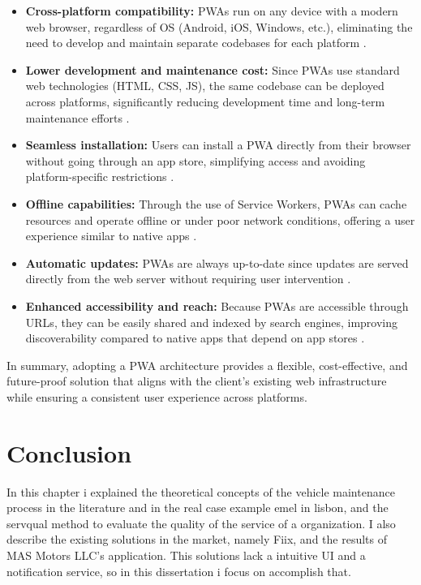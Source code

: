 \begin{itemize}
    \item \textbf{Cross-platform compatibility:} \ac{PWA}s run on any device with a modern web browser, regardless of \ac{OS} (Android, iOS, Windows, etc.), eliminating the need to develop and maintain separate codebases for each platform \cite{Samsyudin}.
    \item \textbf{Lower development and maintenance cost:} Since \ac{PWA}s use standard web technologies (\ac{HTML}, \ac{CSS}, \ac{JS}), the same codebase can be deployed across platforms, significantly reducing development time and long-term maintenance efforts \cite{Naderi2021}.
    \item \textbf{Seamless installation:} Users can install a \ac{PWA} directly from their browser without going through an app store, simplifying access and avoiding platform-specific restrictions \cite{Samsyudin}.
    \item \textbf{Offline capabilities:} Through the use of Service Workers, \ac{PWA}s can cache resources and operate offline or under poor network conditions, offering a user experience similar to native apps \cite{Samsyudin} \cite{Lingolu} .
    \item \textbf{Automatic updates:} \ac{PWA}s are always up-to-date since updates are served directly from the web server without requiring user intervention \cite{Alves2020}\cite{Samsyudin}.
    \item \textbf{Enhanced accessibility and reach:} Because \ac{PWA}s are accessible through \ac{URL}s, they can be easily shared and indexed by search engines, improving discoverability compared to native apps that depend on app stores \cite{Raju_Cherukuri_2024}.
\end{itemize}

In summary, adopting a \ac{PWA} architecture provides a flexible, cost-effective, and future-proof solution that aligns with the client's existing web infrastructure while ensuring a consistent user experience across platforms.


\section{Conclusion}

In this chapter i explained the theoretical concepts of the vehicle maintenance process in the literature and in the real case example \acs{emel} in lisbon, and the \ac{servqual} method to evaluate the quality of the service of a organization.
I also describe the existing solutions in the market, namely Fiix, and the results of MAS Motors LLC's application.
This solutions lack a intuitive \ac{UI} and a notification service, so in this dissertation i focus on accomplish that.

